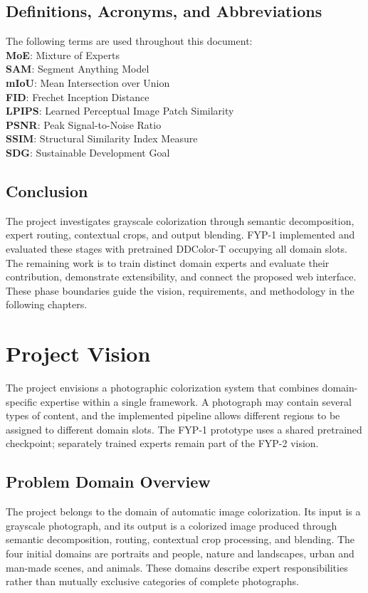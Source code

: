 \documentclass{FastFyp}
\begin{document}
\section{Definitions, Acronyms, and Abbreviations}
The following terms are used throughout this document:\\
\textbf{MoE}: Mixture of Experts\\
\textbf{SAM}: Segment Anything Model\\
\textbf{mIoU}: Mean Intersection over Union\\
\textbf{FID}: Frechet Inception Distance\\
\textbf{LPIPS}: Learned Perceptual Image Patch Similarity\\
\textbf{PSNR}: Peak Signal-to-Noise Ratio\\
\textbf{SSIM}: Structural Similarity Index Measure\\
\textbf{SDG}: Sustainable Development Goal
\section{Conclusion}
The project investigates grayscale colorization through semantic decomposition, expert routing, contextual crops, and output blending. FYP-1 implemented and evaluated these stages with pretrained DDColor-T occupying all domain slots. The remaining work is to train distinct domain experts and evaluate their contribution, demonstrate extensibility, and connect the proposed web interface. These phase boundaries guide the vision, requirements, and methodology in the following chapters.
\chapter{Project Vision}
The project envisions a photographic colorization system that combines domain-specific expertise within a single framework. A photograph may contain several types of content, and the implemented pipeline allows different regions to be assigned to different domain slots. The FYP-1 prototype uses a shared pretrained checkpoint; separately trained experts remain part of the FYP-2 vision.
\section{Problem Domain Overview}
The project belongs to the domain of automatic image colorization. Its input is a grayscale photograph, and its output is a colorized image produced through semantic decomposition, routing, contextual crop processing, and blending. The four initial domains are portraits and people, nature and landscapes, urban and man-made scenes, and animals. These domains describe expert responsibilities rather than mutually exclusive categories of complete photographs.
\end{document}
